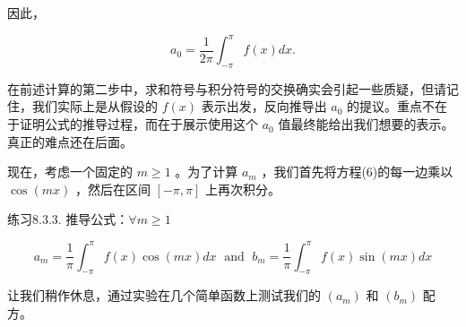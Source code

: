 因此，

\begin{equation}
\label{eq:8.3.9}
{a}_{0} = \frac{1}{2\pi }{\int }_{-\pi }^{\pi }f\left( x\right) {dx}.
\end{equation}

在前述计算的第二步中，求和符号与积分符号的交换确实会引起一些质疑，但请记住，我们实际上是从假设的 \(f\left( x\right)\) 表示出发，反向推导出 \({a}_{0}\) 的提议。重点不在于证明公式的推导过程，而在于展示使用这个 \({a}_{0}\) 值最终能给出我们想要的表示。真正的难点还在后面。

现在，考虑一个固定的 \(m \geq  1\) 。为了计算 \({a}_{m}\) ，我们首先将方程(6)的每一边乘以 \(\cos \left( {mx}\right)\) ，然后在区间 \(\left\lbrack  {-\pi ,\pi }\right\rbrack\) 上再次积分。

练习8.3.3. 推导公式：$\forall m\ge 1$

\begin{equation}
\label{eq:8.3.10}
{a}_{m} = \frac{1}{\pi }{\int }_{-\pi }^{\pi }f\left( x\right) \cos \left( {mx}\right) {dx}\;\text{ and }\;{b}_{m} = \frac{1}{\pi }{\int }_{-\pi }^{\pi }f\left( x\right) \sin \left( {mx}\right) {dx}
\end{equation}

让我们稍作休息，通过实验在几个简单函数上测试我们的 \(\left( {a}_{m}\right)\) 和 \(\left( {b}_{m}\right)\) 配方。

